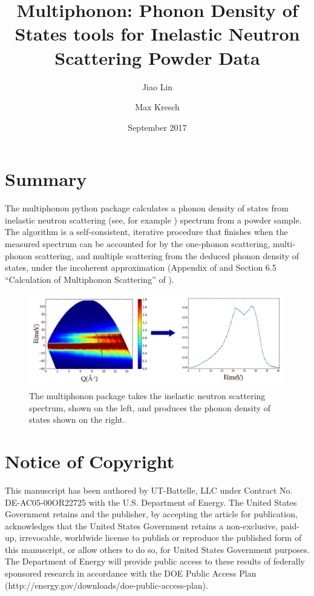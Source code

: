 \documentclass{article}
\title{Multiphonon: Phonon Density of States tools for Inelastic Neutron Scattering Powder Data}
\author[1]{Jiao Lin}
\author[2]{Max Kresch}
\affil[1]{Neutron Data Analysis and Visualization Division, Oak Ridge National Lab}
\affil[2]{mkresch@gmail.com}
\date{September 2017}
\begin{document}
\maketitle

\section{Summary}\label{summary}

The multiphonon python package calculates a phonon density of states from
inelastic neutron scattering (see, for example \cite{FultzINSbook})
spectrum from a powder sample. The algorithm is a self-consistent,
iterative procedure that finishes when
the measured spectrum can be accounted for by
the one-phonon scattering, multi-phonon scattering, and multiple
scattering from the deduced phonon density of states, under the
incoherent approximation (Appendix of \cite{KreschNickel2007} and
Section 6.5 ``Calculation of Multiphonon Scattering'' of
\cite{FultzINSbook}).

\begin{figure}
  \includegraphics[scale=0.25]{sqe2dos}
  \caption{The multiphonon package takes the inelastic neutron scattering spectrum, shown on the left, and produces the phonon density of states shown on the right.}
\end{figure}


\section{Notice of Copyright}\label{notice-of-copyright}

This manuscript has been authored by UT-Battelle, LLC under Contract No.
DE-AC05-00OR22725 with the U.S. Department of Energy. The United States
Government retains and the publisher, by accepting the article for
publication, acknowledges that the United States Government retains a
non-exclusive, paid-up, irrevocable, worldwide license to publish or
reproduce the published form of this manuscript, or allow others to do
so, for United States Government purposes. The Department of Energy will
provide public access to these results of federally sponsored research
in accordance with the DOE Public Access Plan
(http://energy.gov/downloads/doe-public-access-plan).
\end{document}
